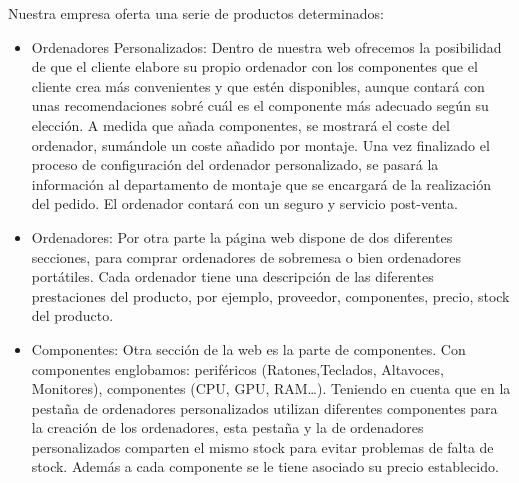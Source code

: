 Nuestra empresa oferta una serie de productos determinados:
\begin{itemize}
    \item Ordenadores Personalizados: Dentro de nuestra web ofrecemos la posibilidad de que el cliente elabore su propio ordenador con los componentes que el cliente crea más convenientes y que estén disponibles, aunque contará con unas recomendaciones sobré cuál es el componente más adecuado según su elección. A medida que añada componentes, se mostrará el coste del ordenador, sumándole un coste añadido por montaje. Una vez finalizado el proceso de configuración del ordenador personalizado, se pasará la información al departamento de montaje que se encargará de la realización del pedido. El ordenador contará con un seguro y servicio post-venta.
    \item Ordenadores: Por otra parte la página web dispone de dos diferentes secciones, para comprar ordenadores de sobremesa o bien ordenadores portátiles. Cada ordenador tiene una descripción de las diferentes prestaciones del producto, por ejemplo, proveedor, componentes, precio, stock del producto. 
    \item Componentes: Otra sección de la web es la parte de componentes.
    Con componentes englobamos: periféricos (Ratones,Teclados, Altavoces, Monitores), componentes (CPU, GPU, RAM…). Teniendo en cuenta que en la pestaña de ordenadores personalizados utilizan diferentes componentes para la creación de los ordenadores, esta pestaña y la de ordenadores personalizados comparten el mismo stock para evitar problemas de falta de stock. Además a cada componente se le tiene asociado su precio establecido.    
\end{itemize}